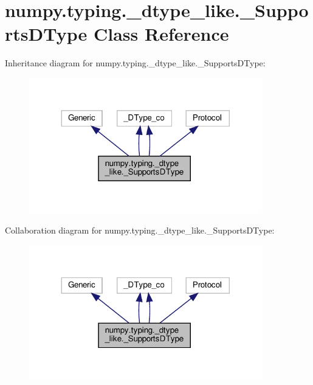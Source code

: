 \hypertarget{classnumpy_1_1typing_1_1__dtype__like_1_1__SupportsDType}{}\section{numpy.\+typing.\+\_\+dtype\+\_\+like.\+\_\+\+Supports\+D\+Type Class Reference}
\label{classnumpy_1_1typing_1_1__dtype__like_1_1__SupportsDType}


Inheritance diagram for numpy.\+typing.\+\_\+dtype\+\_\+like.\+\_\+\+Supports\+D\+Type\+:
\nopagebreak
\begin{figure}[H]
\begin{center}
\leavevmode
\includegraphics[width=287pt]{classnumpy_1_1typing_1_1__dtype__like_1_1__SupportsDType__inherit__graph}
\end{center}
\end{figure}


Collaboration diagram for numpy.\+typing.\+\_\+dtype\+\_\+like.\+\_\+\+Supports\+D\+Type\+:
\nopagebreak
\begin{figure}[H]
\begin{center}
\leavevmode
\includegraphics[width=287pt]{classnumpy_1_1typing_1_1__dtype__like_1_1__SupportsDType__coll__graph}
\end{center}
\end{figure}
